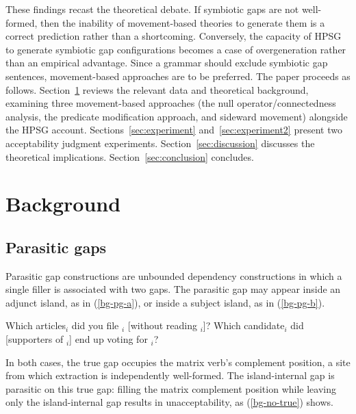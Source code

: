 \documentclass[12pt]{article}
\begin{document}
These findings recast the theoretical debate. If symbiotic gaps are not well-formed, then the inability of movement-based theories to generate them is a correct prediction rather than a shortcoming. Conversely, the capacity of HPSG to generate symbiotic gap configurations becomes a case of overgeneration rather than an empirical advantage. Since a grammar should exclude symbiotic gap sentences, movement-based approaches are to be preferred. The paper proceeds as follows. Section~\ref{sec:background} reviews the relevant data and theoretical background, examining three movement-based approaches (the null operator/connectedness analysis, the predicate modification approach, and sideward movement) alongside the HPSG account. Sections~\ref{sec:experiment} and~\ref{sec:experiment2} present two acceptability judgment experiments. Section~\ref{sec:discussion} discusses the theoretical implications. Section~\ref{sec:conclusion} concludes.


\section{Background}\label{sec:background}

\subsection{Parasitic gaps}\label{sec:bg-pg}

Parasitic gap constructions are unbounded dependency constructions in which a single filler is associated with two gaps. The parasitic gap may appear inside an adjunct island, as in (\ref{bg-pg-a}), or inside a subject island, as in (\ref{bg-pg-b}).

\pex
\a\label{bg-pg-a} Which articles$_i$ did you file \underline{\hspace{1em}}$_i$ [without reading \underline{\hspace{1em}}$_i$]?
\a\label{bg-pg-b} Which candidate$_i$ did [supporters of \underline{\hspace{1em}}$_i$] end up voting for \underline{\hspace{1em}}$_i$?
\xe

\noindent In both cases, the true gap occupies the matrix verb's complement position, a site from which extraction is independently well-formed. The island-internal gap is parasitic on this true gap: filling the matrix complement position while leaving only the island-internal gap results in unacceptability, as (\ref{bg-no-true}) shows.
\end{document}
